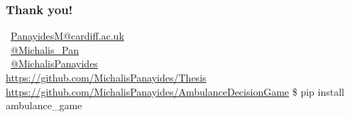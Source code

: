 \begin{frame}
    \frametitle{\Large{Thank you!}}
    \centering


    \vspace{1.5cm}
    \faEnvelope \, \url{PanayidesM@cardiff.ac.uk} \\
    \faTwitterSquare \, \url{@Michalis_Pan} \\
    \faGithubSquare \, \url{@MichalisPanayides} \\


    \vspace{1.5cm}
    \small{\url{https://github.com/MichalisPanayides/Thesis}}
    \small{\url{https://github.com/MichalisPanayides/AmbulanceDecisionGame}}
    \small{\$ pip install ambulance\_game}

\end{frame}



